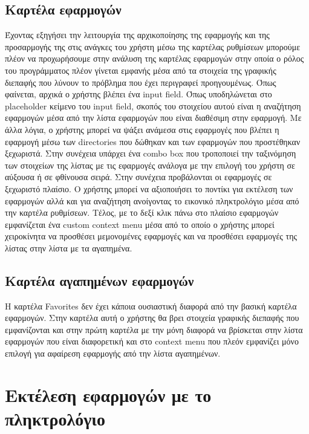 \subsection{Καρτέλα εφαρμογών}

Έχοντας εξηγήσει την λειτουργία της αρχικοποίησης της εφαρμογής και της προσαρμογής της στις
ανάγκες του χρήστη μέσω της καρτέλας ρυθμίσεων μπορούμε πλέον να προχωρήσουμε στην ανάλυση
της καρτέλας εφαρμογών στην οποία ο ρόλος του προγράμματος πλέον γίνεται εμφανής μέσα από τα
στοιχεία της γραφικής διεπαφής που λύνουν το πρόβλημα που έχει περιγραφεί προηγουμένως. 
Όπως φαίνεται, αρχικά ο χρήστης βλέπει ένα input field. Όπως υποδηλώνεται στο placeholder
κείμενο του input field, σκοπός του στοιχείου αυτού είναι η αναζήτηση εφαρμογών μέσα από την
λίστα εφαρμογών που είναι διαθέσιμη στην εφαρμογή. Με άλλα λόγια, ο χρήστης μπορεί να ψάξει 
ανάμεσα στις εφαρμογές που βλέπει η εφαρμογή μέσω των directories που δώθηκαν και των εφαρμογών
που προστέθηκαν ξεχωριστά. Στην συνέχεια υπάρχει ένα combo box που τροποποιεί την ταξινόμηση
των στοιχείων της λίστας με τις εφαρμογές ανάλογα με την επιλογή του χρήστη σε αύξουσα ή σε
φθίνουσα σειρά. Στην συνέχεια προβάλονται οι εφαρμογές σε ξεχωριστό πλαίσιο. Ο χρήστης μπορεί
να αξιοποιήσει το ποντίκι για εκτέλεση των εφαρμογών αλλά και για αναζήτηση ανοίγοντας το εικονικό
πληκτρολόγιο μέσα από την καρτέλα ρυθμίσεων. Τέλος, με το δεξί κλικ πάνω στο πλαίσιο εφαρμογών
εμφανίζεται ένα custom context menu μέσα από το οποίο ο χρήστης μπορεί χειροκίνητα να προσθέσει
μεμονομένες εφαρμογές και να προσθέσει εφαρμογές της λίστας στην λίστα με τα αγαπημένα.



\subsection{Καρτέλα αγαπημένων εφαρμογών}

Η καρτέλα Favorites δεν έχει κάποια ουσιαστική διαφορά από την βασική καρτέλα εφαρμογών. Στην 
καρτέλα αυτή ο χρήστης θα βρει στοιχεία γραφικής διεπαφής που εμφανίζονται και στην πρώτη καρτέλα
με την μόνη διαφορά να βρίσκεται στην λίστα εφαρμογών που είναι διαφορετική και στο context menu
που πλεόν εμφανίζει μόνο επιλογή για αφαίρεση εφαρμογής από την λίστα αγαπημένων.


\section{Εκτέλεση εφαρμογών με το πληκτρολόγιο}

